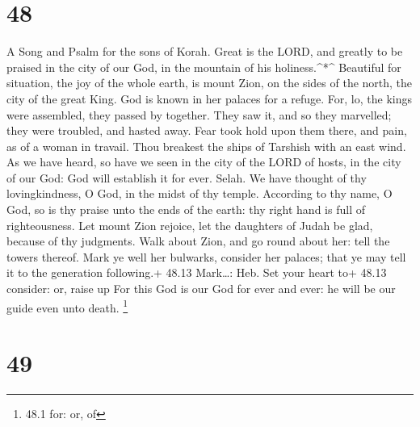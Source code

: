 \hypertarget{section-47}{%
\section{48}\label{section-47}}

A Song and Psalm for the sons of Korah.  Great is the LORD,
and greatly to be praised in the city of our God, in the mountain of his
holiness.\^{}*\^{}  Beautiful for situation, the joy of the
whole earth, is mount Zion, on the sides of the north, the city of the
great King.  God is known in her palaces for a refuge.
 For, lo, the kings were assembled, they passed by together.
 They saw it, and so they marvelled; they were troubled, and
hasted away.  Fear took hold upon them there, and pain, as
of a woman in travail.  Thou breakest the ships of Tarshish
with an east wind.  As we have heard, so have we seen in the
city of the LORD of hosts, in the city of our God: God will establish it
for ever. Selah.  We have thought of thy lovingkindness, O
God, in the midst of thy temple.  According to thy name, O
God, so is thy praise unto the ends of the earth: thy right hand is full
of righteousness.  Let mount Zion rejoice, let the
daughters of Judah be glad, because of thy judgments.  Walk
about Zion, and go round about her: tell the towers thereof.
 Mark ye well her bulwarks, consider her palaces; that ye
may tell it to the generation following.+ 48.13 Mark\ldots: Heb. Set
your heart to+ 48.13 consider: or, raise up  For this God
is our God for ever and ever: he will be our guide even unto death.
\footnote{48.1 for: or, of}

\hypertarget{section-48}{%
\section{49}\label{section-48}}

